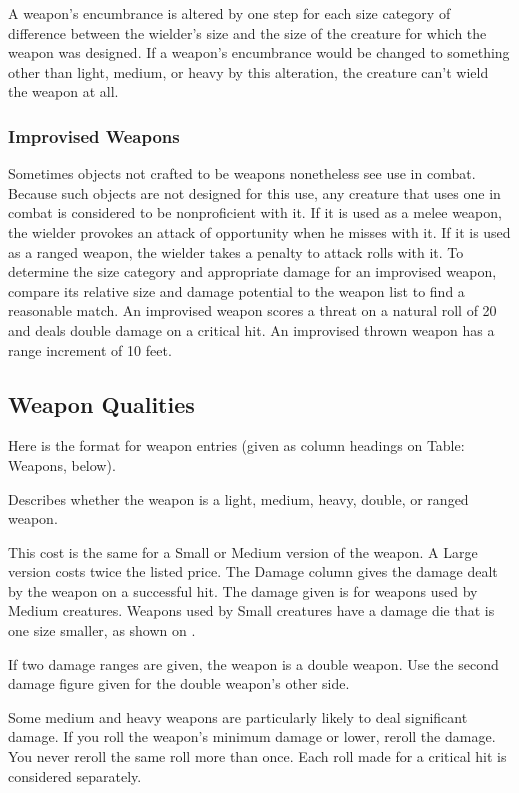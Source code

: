  A weapon's encumbrance is altered by one step for each size category of difference between the wielder's size and the size of the creature for which the weapon was designed. If a weapon's encumbrance would be changed to something other than light, medium, or heavy by this alteration, the creature can't wield the weapon at all.

\subsubsection{Improvised Weapons} Sometimes objects not crafted to be weapons nonetheless see use in combat. Because such objects are not designed for this use, any creature that uses one in combat is considered to be nonproficient with it. If it is used as a melee weapon, the wielder provokes an attack of opportunity when he misses with it. If it is used as a ranged weapon, the wielder takes a  penalty to attack rolls with it. To determine the size category and appropriate damage for an improvised weapon, compare its relative size and damage potential to the weapon list to find a reasonable match. An improvised weapon scores a threat on a natural roll of 20 and deals double damage on a critical hit. An improvised thrown weapon has a range increment of 10 feet.

\subsection{Weapon Qualities}
Here is the format for weapon entries (given as column headings on Table: Weapons, below).

 Describes whether the weapon is a light, medium, heavy, double, or ranged weapon.

\par This cost is the same for a Small or Medium version of the weapon. A Large version costs twice the listed price.
 The Damage column gives the damage dealt by the weapon on a successful hit. The damage given is for weapons used by Medium creatures. Weapons used by Small creatures have a damage die that is one size smaller, as shown on .

If two damage ranges are given, the weapon is a double weapon. Use the second damage figure given for the double weapon's other side.

 Some medium and heavy weapons are particularly likely to deal significant damage. If you roll the weapon's minimum damage or lower, reroll the damage. You never reroll the same roll more than once. Each roll made for a critical hit is considered separately.

